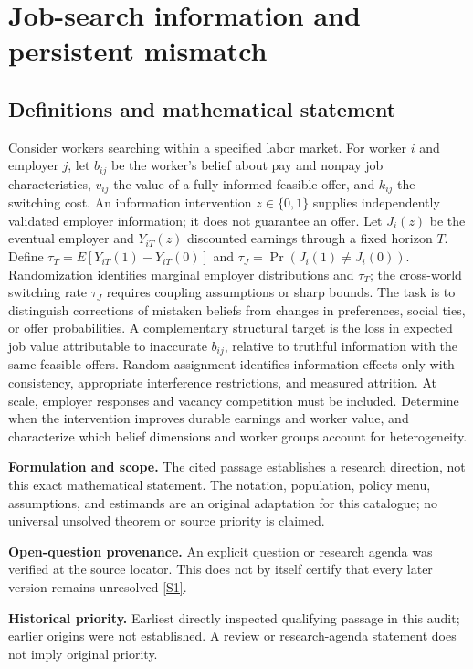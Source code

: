 \documentclass[11pt]{article}
\newcommand{\sref}[2]{\hyperlink{source:#1:#2}{[S#2]}}
\begin{document}
\section*{Job-search information and persistent mismatch}\label{30007634}
\subsection{Definitions and mathematical statement}
Consider workers searching within a specified labor market. For worker \(i\) and employer \(j\), let \(b_{ij}\) be the worker's belief about pay and nonpay job characteristics, \(v_{ij}\) the value of a fully informed feasible offer, and \(k_{ij}\) the switching cost. An information intervention \(z\in\{0,1\}\) supplies independently validated employer information; it does not guarantee an offer. Let \(J_i(z)\) be the eventual employer and \(Y_{iT}(z)\) discounted earnings through a fixed horizon \(T\). Define \(\tau_T=E[Y_{iT}(1)-Y_{iT}(0)]\) and \(\tau_J=\Pr(J_i(1)\ne J_i(0))\). Randomization identifies marginal employer distributions and \(\tau_T\); the cross-world switching rate \(\tau_J\) requires coupling assumptions or sharp bounds. The task is to distinguish corrections of mistaken beliefs from changes in preferences, social ties, or offer probabilities. A complementary structural target is the loss in expected job value attributable to inaccurate \(b_{ij}\), relative to truthful information with the same feasible offers. Random assignment identifies information effects only with consistency, appropriate interference restrictions, and measured attrition. At scale, employer responses and vacancy competition must be included. Determine when the intervention improves durable earnings and worker value, and characterize which belief dimensions and worker groups account for heterogeneity.

\par\textbf{Formulation and scope.} The cited passage establishes a research direction, not this exact mathematical statement. The notation, population, policy menu, assumptions, and estimands are an original adaptation for this catalogue; no universal unsolved theorem or source priority is claimed.

\par\textbf{Open-question provenance.} An explicit question or research agenda was verified at the source locator. This does not by itself certify that every later version remains unresolved \sref{30007634}{1}.

\par\textbf{Historical priority.} Earliest directly inspected qualifying passage in this audit; earlier origins were not established. A review or research-agenda statement does not imply original priority.
\end{document}
